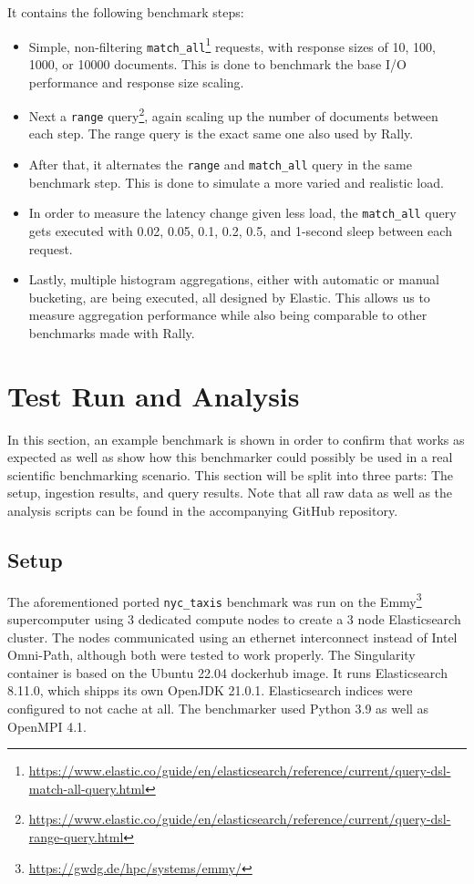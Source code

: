 It contains the following benchmark steps:
\begin{itemize}
  \item Simple, non-filtering \texttt{match\_all}\footnote{\url{https://www.elastic.co/guide/en/elasticsearch/reference/current/query-dsl-match-all-query.html}} requests, with response sizes of 10, 100, 1000, or 10000 documents. This is done to benchmark the base I/O performance and response size scaling.
  \item Next a \texttt{range} query\footnote{\url{https://www.elastic.co/guide/en/elasticsearch/reference/current/query-dsl-range-query.html}}, again scaling up the number of documents between each step. The range query is the exact same one also used by Rally.
  \item After that, it alternates the \texttt{range} and \texttt{match\_all} query in the same benchmark step. This is done to simulate a more varied and realistic load.
  \item In order to measure the latency change given less load, the \texttt{match\_all} query gets executed with 0.02, 0.05, 0.1, 0.2, 0.5, and 1-second sleep between each request.
  \item Lastly, multiple histogram aggregations, either with automatic or manual bucketing, are being executed, all designed by Elastic. This allows us to measure aggregation performance while also being comparable to other benchmarks made with Rally.
\end{itemize}

\section{Test Run and Analysis}
In this section, an example benchmark is shown in order to confirm that works as expected as well as show how this benchmarker could possibly be used in a real scientific benchmarking scenario. This section will be split into three parts: The setup, ingestion results, and query results. Note that all raw data as well as the analysis scripts can be found in the accompanying GitHub repository.

\subsection{Setup}
The aforementioned ported \texttt{nyc\_taxis} benchmark was run on the Emmy\footnote{\url{https://gwdg.de/hpc/systems/emmy/}} supercomputer using 3 dedicated compute nodes to create a 3 node Elasticsearch cluster. The nodes communicated using an ethernet interconnect instead of Intel Omni-Path, although both were tested to work properly. The Singularity container is based on the Ubuntu 22.04 dockerhub image. It runs Elasticsearch 8.11.0, which shipps its own OpenJDK 21.0.1. Elasticsearch indices were configured to not cache at all. The benchmarker used Python 3.9 as well as OpenMPI 4.1.

